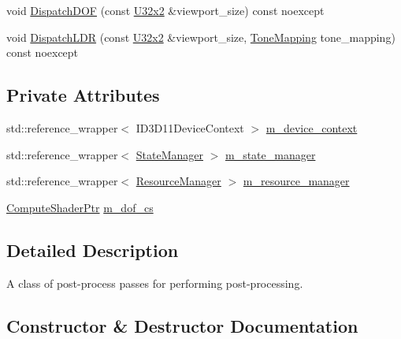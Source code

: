 \begin{DoxyCompactItemize}
\item 
void \mbox{\hyperlink{classmage_1_1rendering_1_1_post_process_pass_a5a580293635c790deb09e958724021c2}{Dispatch\+D\+OF}} (const \mbox{\hyperlink{namespacemage_ae5e7ccf8a1785baaacf57b3a0f4324e2}{U32x2}} \&viewport\+\_\+size) const noexcept
\item 
void \mbox{\hyperlink{classmage_1_1rendering_1_1_post_process_pass_a8736c2eb9872035c2e5d109681f72146}{Dispatch\+L\+DR}} (const \mbox{\hyperlink{namespacemage_ae5e7ccf8a1785baaacf57b3a0f4324e2}{U32x2}} \&viewport\+\_\+size, \mbox{\hyperlink{namespacemage_1_1rendering_a789e4b7d9a8cc831b065e9c6bb7430e9}{Tone\+Mapping}} tone\+\_\+mapping) const noexcept
\end{DoxyCompactItemize}
\subsection*{Private Attributes}
\begin{DoxyCompactItemize}
\item 
std\+::reference\+\_\+wrapper$<$ I\+D3\+D11\+Device\+Context $>$ \mbox{\hyperlink{classmage_1_1rendering_1_1_post_process_pass_a18468bc4ffa408e9db3089b306f45291}{m\+\_\+device\+\_\+context}}
\item 
std\+::reference\+\_\+wrapper$<$ \mbox{\hyperlink{classmage_1_1rendering_1_1_state_manager}{State\+Manager}} $>$ \mbox{\hyperlink{classmage_1_1rendering_1_1_post_process_pass_a80cbe6aee950e5bcc98763813fdb8aba}{m\+\_\+state\+\_\+manager}}
\item 
std\+::reference\+\_\+wrapper$<$ \mbox{\hyperlink{classmage_1_1rendering_1_1_resource_manager}{Resource\+Manager}} $>$ \mbox{\hyperlink{classmage_1_1rendering_1_1_post_process_pass_af20e46967d28e7e0500fff6b1988ad80}{m\+\_\+resource\+\_\+manager}}
\item 
\mbox{\hyperlink{namespacemage_1_1rendering_ab3dc9f2114f2e9255b91d9c051da52ea}{Compute\+Shader\+Ptr}} \mbox{\hyperlink{classmage_1_1rendering_1_1_post_process_pass_aec72e5a7ca28c11754f85ab6726ce5ec}{m\+\_\+dof\+\_\+cs}}
\end{DoxyCompactItemize}


\subsection{Detailed Description}
A class of post-\/process passes for performing post-\/processing. 

\subsection{Constructor \& Destructor Documentation}
\mbox{\label{classmage_1_1rendering_1_1_post_process_pass_aa7989cc618c40d64e6e86f1aa8576dff}} 

